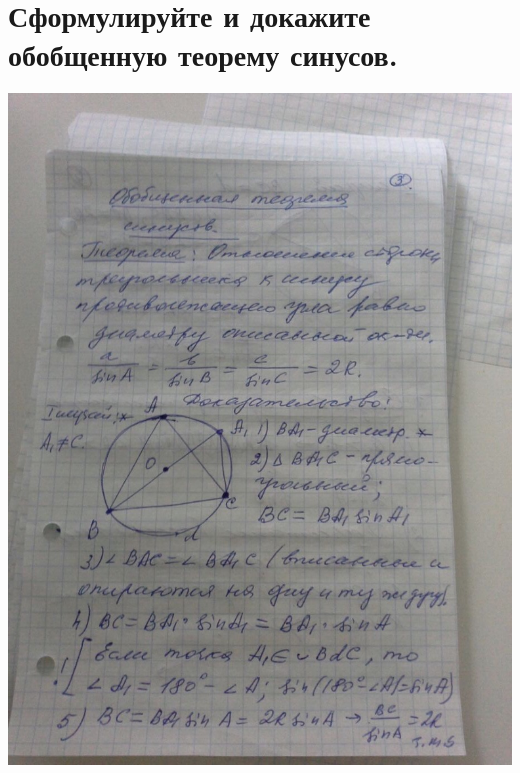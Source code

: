 \documentclass[12pt, letterpaper]{article}
\begin{document}
\section {Сформулируйте и докажите обобщенную теорему синусов.}
\includegraphics[scale=0.3]{photo6.jpg} \\
\end{document}
